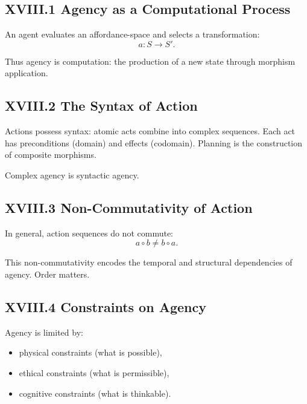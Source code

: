 \documentclass[12pt,letterpaper]{article}
\begin{document}
\subsection{XVIII.1 Agency as a Computational Process}

An agent evaluates an affordance-space and selects a transformation:
\[
a: S \to S'.
\]

Thus agency is computation: the production of a new state through morphism application.

\subsection{XVIII.2 The Syntax of Action}

Actions possess syntax: atomic acts combine into complex sequences. Each act has preconditions (domain) and effects (codomain). Planning is the construction of composite morphisms.

Complex agency is syntactic agency.

\subsection{XVIII.3 Non-Commutativity of Action}

In general, action sequences do not commute:
\[
a \circ b \neq b \circ a.
\]

This non-commutativity encodes the temporal and structural dependencies of agency. Order matters.

\subsection{XVIII.4 Constraints on Agency}

Agency is limited by:

\begin{itemize}
    \item physical constraints (what is possible),
    \item ethical constraints (what is permissible),
    \item cognitive constraints (what is thinkable).
\end{itemize}
\end{document}
